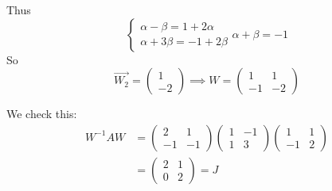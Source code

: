 \documentclass[10pt]{scrartcl}
\begin{document}
\begin{example}
Thus
\[
  \begin{cases}
  \alpha - \beta = 1 + 2\alpha\\
  \alpha + 3\beta = -1 + 2\beta	
  \end{cases}
 \alpha + \beta = -1
\]
So 
\[
  \vec{W_2} = \begin{pmatrix}
  1\\ -2
\end{pmatrix}\implies 
 W = 
 \begin{pmatrix}
  1 & 1\\ -1 & -2
\end{pmatrix}
\]

We check this: 
\begin{align*}
  W^{-1}AW &= 
  \begin{pmatrix}
  2 & 1\\ -1 & -1
\end{pmatrix}
\begin{pmatrix}
  1 & -1 \\ 1 & 3
\end{pmatrix}
\begin{pmatrix}
  1 & 1\\ -1 & 2
\end{pmatrix}\\
&= 
\begin{pmatrix}
  2 & 1 \\ 0 & 2
\end{pmatrix} = J
\end{align*}


\end{example}
\end{document}
